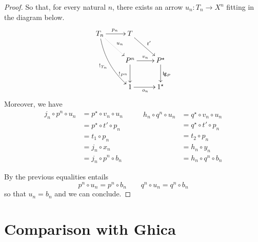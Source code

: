 \documentclass[runningheads,envcountsect]{llncs}
\newcommand{\lgh}{\mathsf{lg}}
\begin{document}
\begin{proof}
So that, for every natural $n$, there exists an arrow $u_n\colon T_n \to X^n$ fitting in the diagram below.
\[\xymatrix{T_n  \ar@/_.3cm/[ddr]_{!_{T_n}}\ar@{.>}[dr]^{u_n} \ar[r]^{p_n} & T \ar[dr]^{t'}\\ &P^n   \ar[d]_{!_{P^n}}\ar[r]^{v_n}& P^\star \ar[d]^{\lgh_P}\\ & 1 \ar[r]_{o_n}& 1^\star }\]
Moreover, we have
\[\begin{split}
j_n\circ	p^n\circ u_n&=p^\star \circ  v_n\circ u_n\\&=p^\star \circ t'\circ p_n\\&=t_1\circ p_n\\&=j_n\circ x_n\\&=j_n\circ p^n\circ b_n
\end{split}\qquad \begin{split}
h_n\circ	q^n\circ u_n&=q^\star \circ  v_n\circ u_n\\&=q^\star \circ t'\circ p_n\\&=t_2\circ p_n\\&=h_n\circ y_n\\&=h_n\circ q^n\circ b_n
\end{split}\]

By  the previous equalities entails
\[p^n\circ u_n=p^n\circ b_n \qquad q^n\circ u_n=q^n\circ b_n\]
so that $u_n=b_n$ and we can conclude.
\end{proof}


\section{Comparison with Ghica}
\end{document}

